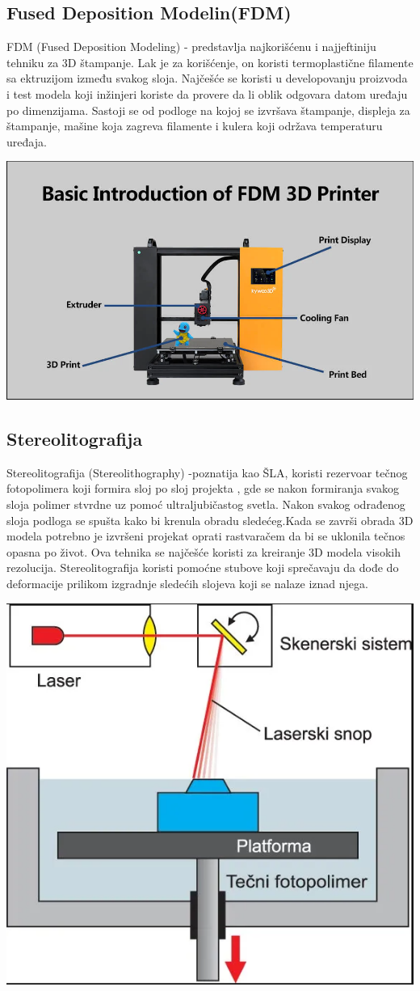 \documentclass[a4paper]{article}
\begin{document}
{\subsection{Fused Deposition Modelin(FDM)}
\label{subsec:podnaslov2}
FDM (Fused Deposition Modeling) - predstavlja najkorišćenu i najjeftiniju tehniku za 3D štampanje. Lak je za korišćenje, on koristi termoplastične filamente sa ektruzijom između svakog sloja.
\bigbreak Najčešće se koristi u developovanju proizvoda  i test modela koji inžinjeri koriste da provere da li oblik odgovara datom uređaju po dimenzijama. 
\bigbreak Sastoji se od podloge na kojoj se izvršava štampanje, displeja za štampanje, mašine koja zagreva filamente i kulera koji održava temperaturu uređaja.

\begin{center}
\includegraphics[width=.5\textwidth ]{Tehnikeslike/FDM.PNG}
\end{center}

\subsection{Stereolitografija}
\label{subsec:podnaslov3}
Stereolitografija (Stereolithography) -poznatija kao ŠLA, koristi rezervoar tečnog fotopolimera koji formira sloj po sloj projekta , gde se nakon formiranja svakog sloja polimer stvrdne uz pomoć ultraljubičastog svetla.
\bigbreak Nakon svakog odrađenog sloja podloga se spušta kako bi krenula obradu sledećeg.Kada se završi obrada 3D modela potrebno je izvršeni projekat oprati rastvaračem da bi se uklonila tečnos opasna po život.
\bigbreak Ova tehnika se najčešće koristi za kreiranje 3D modela visokih rezolucija.  Stereolitografija koristi pomoćne stubove koji sprečavaju da dođe do deformacije prilikom izgradnje sledećih slojeva koji se nalaze iznad njega.

\begin{center}
\includegraphics[width=.5\textwidth ]{Tehnikeslike/Stereolitografija.PNG}
\end{center}

}
\end{document}
